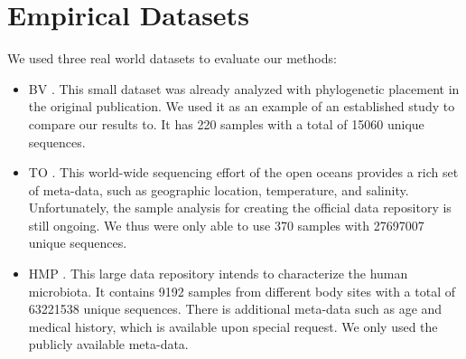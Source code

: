 
\chapter{Empirical Datasets}
\label{ch:EmpiricalDatasets}


We used three %
real world datasets to evaluate our methods:

\begin{itemize}
    \item   \acf{BV} \cite{Srinivasan2012}.
            This small dataset was already analyzed with phylogenetic placement in the original publication.
            We used it as an example of an established study to compare our results to.
            It has \num{220} samples with a total of \num{15 060} unique sequences.
    \item   \acf{TO} \cite{Karsenti2011,Sunagawa2015,Guidi2016}.
            This world-wide sequencing effort of the open oceans provides a rich set of meta-data,
            such as geographic location, temperature, and salinity.
            Unfortunately, the sample analysis for creating the official data repository is still ongoing.
            We thus were only able to use \num{370} samples with \num{27 697 007} unique sequences.
    \item   \acf{HMP} \cite{Huttenhower2012,Methe2012}.
            This large data repository intends to characterize the human microbiota.
            It contains \num{9192} samples from different body sites with a total of \num{63 221 538} unique sequences.
            There is additional meta-data such as age and medical history, which is available upon special request.
            We only used the publicly available meta-data.
\end{itemize}

